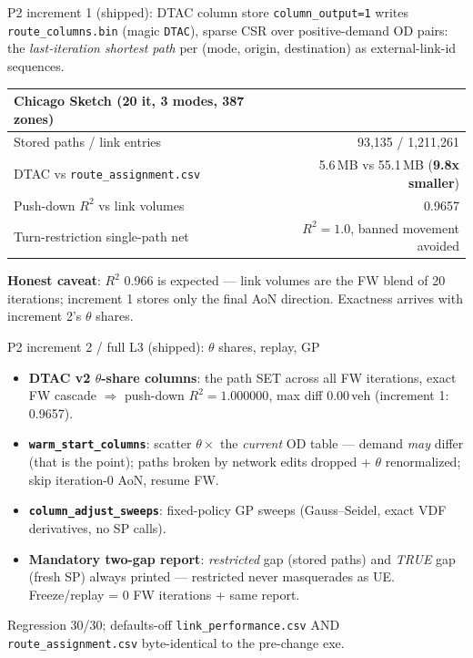 \documentclass[10pt]{beamer}
\newcommand{\code}[1]{\texttt{#1}}
\begin{document}
\begin{frame}{P2 increment 1 (shipped): DTAC column store}
  \code{column\_output=1} writes \code{route\_columns.bin} (magic \code{DTAC}),
  sparse CSR over positive-demand OD pairs: the \emph{last-iteration shortest
  path} per (mode, origin, destination) as external-link-id sequences.
  \begin{table}
  \centering
  \begin{tabular}{lr}
    \toprule
    Chicago Sketch (20 it, 3 modes, 387 zones) & \\
    \midrule
    Stored paths / link entries & 93{,}135 / 1{,}211{,}261 \\
    DTAC vs \code{route\_assignment.csv} & 5.6\,MB vs 55.1\,MB
      (\textbf{9.8x smaller}) \\
    Push-down $R^2$ vs link volumes & 0.9657 \\
    Turn-restriction single-path net & $R^2 = 1.0$, banned movement avoided \\
    \bottomrule
  \end{tabular}
  \end{table}
  \textbf{Honest caveat}: $R^2$ 0.966 is expected --- link volumes are the FW
  blend of 20 iterations; increment 1 stores only the final AoN direction.
  Exactness arrives with increment 2's $\theta$ shares.
\end{frame}

\begin{frame}{P2 increment 2 / full L3 (shipped): $\theta$ shares, replay, GP}
  \begin{itemize}
    \item \textbf{DTAC v2 $\theta$-share columns}: the path SET across all FW
      iterations, exact FW cascade $\Rightarrow$ push-down
      $R^2 = 1.000000$, max diff 0.00\,veh (increment 1: 0.9657).
    \item \textbf{\code{warm\_start\_columns}}: scatter $\theta \times$ the
      \emph{current} OD table --- demand \emph{may} differ (that is the point);
      paths broken by network edits dropped + $\theta$ renormalized;
      skip iteration-0 AoN, resume FW.
    \item \textbf{\code{column\_adjust\_sweeps}}: fixed-policy GP sweeps
      (Gauss--Seidel, exact VDF derivatives, no SP calls).
    \item \textbf{Mandatory two-gap report}: \emph{restricted} gap (stored
      paths) and \emph{TRUE} gap (fresh SP) always printed --- restricted
      never masquerades as UE. Freeze/replay = 0 FW iterations + same report.
  \end{itemize}
  \medskip
  Regression 30/30; defaults-off \code{link\_performance.csv} AND
  \code{route\_assignment.csv} byte-identical to the pre-change exe.
\end{frame}
\end{document}
